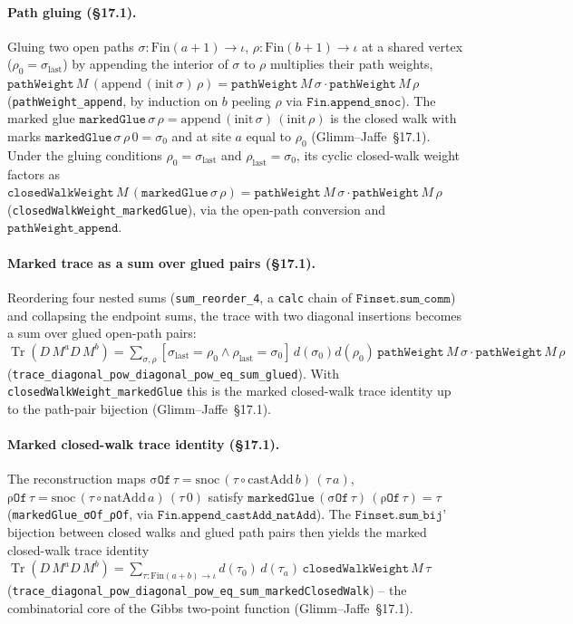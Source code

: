 \documentclass[a4paper,11pt]{article}
\begin{document}
\paragraph{Path gluing (\S17.1).}
Gluing two open paths $\sigma : \mathrm{Fin}(a{+}1)\to\iota$,
$\rho : \mathrm{Fin}(b{+}1)\to\iota$ at a shared vertex ($\rho_0 = \sigma_{\mathrm{last}}$)
by appending the interior of $\sigma$ to $\rho$ multiplies their path weights,
$\texttt{pathWeight}\,M\,(\mathrm{append}\,(\mathrm{init}\,\sigma)\,\rho) = \texttt{pathWeight}\,M\,\sigma \cdot \texttt{pathWeight}\,M\,\rho$
(\texttt{pathWeight\_append}, by induction on $b$ peeling $\rho$ via
$\texttt{Fin.append\_snoc}$). The marked glue
$\texttt{markedGlue}\,\sigma\,\rho = \mathrm{append}\,(\mathrm{init}\,\sigma)\,(\mathrm{init}\,\rho)$
is the closed walk with marks $\texttt{markedGlue}\,\sigma\,\rho\,0 = \sigma_0$ and at
site $a$ equal to $\rho_0$ (Glimm--Jaffe~\S17.1).
Under the gluing conditions $\rho_0 = \sigma_{\mathrm{last}}$ and
$\rho_{\mathrm{last}} = \sigma_0$, its cyclic closed-walk weight factors as
$\texttt{closedWalkWeight}\,M\,(\texttt{markedGlue}\,\sigma\,\rho) = \texttt{pathWeight}\,M\,\sigma \cdot \texttt{pathWeight}\,M\,\rho$
(\texttt{closedWalkWeight\_markedGlue}), via the open-path conversion and
$\texttt{pathWeight\_append}$.

\paragraph{Marked trace as a sum over glued pairs (\S17.1).}
Reordering four nested sums (\texttt{sum\_reorder\_4}, a \texttt{calc} chain of
$\texttt{Finset.sum\_comm}$) and collapsing the endpoint sums, the trace with two
diagonal insertions becomes a sum over glued open-path pairs:
$\operatorname{Tr}(D\,M^a D\,M^b) = \sum_{\sigma,\rho} [\sigma_{\mathrm{last}}=\rho_0 \wedge \rho_{\mathrm{last}}=\sigma_0]\, d(\sigma_0)d(\rho_0)\,\texttt{pathWeight}\,M\,\sigma\cdot\texttt{pathWeight}\,M\,\rho$
(\texttt{trace\_diagonal\_pow\_diagonal\_pow\_eq\_sum\_glued}). With
\texttt{closedWalkWeight\_markedGlue} this is the marked closed-walk trace identity
up to the path-pair bijection (Glimm--Jaffe~\S17.1).

\paragraph{Marked closed-walk trace identity (\S17.1).}
The reconstruction maps $\texttt{σOf}\,\tau = \mathrm{snoc}\,(\tau\circ\mathrm{castAdd}\,b)\,(\tau\,a)$,
$\texttt{ρOf}\,\tau = \mathrm{snoc}\,(\tau\circ\mathrm{natAdd}\,a)\,(\tau\,0)$ satisfy
$\texttt{markedGlue}\,(\texttt{σOf}\,\tau)\,(\texttt{ρOf}\,\tau) = \tau$
(\texttt{markedGlue\_σOf\_ρOf}, via $\texttt{Fin.append\_castAdd\_natAdd}$). The
$\texttt{Finset.sum\_bij'}$ bijection between closed walks and glued path pairs then
yields the marked closed-walk trace identity
$\operatorname{Tr}(D\,M^a D\,M^b) = \sum_{\tau : \mathrm{Fin}(a{+}b)\to\iota} d(\tau_0)\,d(\tau_a)\,\texttt{closedWalkWeight}\,M\,\tau$
(\texttt{trace\_diagonal\_pow\_diagonal\_pow\_eq\_sum\_markedClosedWalk}) -- the
combinatorial core of the Gibbs two-point function (Glimm--Jaffe~\S17.1).
\end{document}
